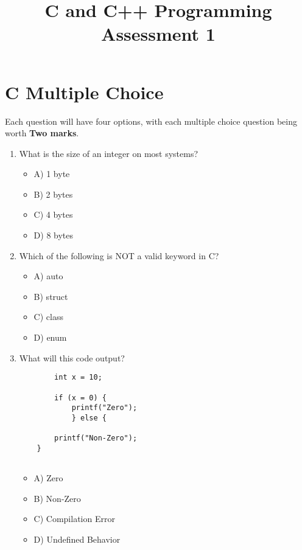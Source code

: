 \documentclass[a4paper,12pt]{article}
\begin{document}
\title{C and C++ Programming Assessment 1}
\maketitle

\newpage
\pagestyle{empty}

\section{C Multiple Choice}

Each question will have four options, with each multiple choice question being worth \textbf{Two marks}.

\begin{enumerate}
    \item What is the size of an integer on most systems?
    \begin{itemize}
        \item A) 1 byte
        \item B) 2 bytes
        \item C) 4 bytes
        \item D) 8 bytes
    \end{itemize}

    \item Which of the following is NOT a valid keyword in C?
    \begin{itemize}
        \item A) auto
        \item B) struct
        \item C) class
        \item D) enum
    \end{itemize}

    \item What will this code output?

    \lstset{language=C}
    \begin{lstlisting}
        int x = 10;
        
        if (x = 0) {
            printf("Zero");
            } else {
    
        printf("Non-Zero");
    }
    
    \end{lstlisting}    
    
    \begin{itemize}
        \item A) Zero
        \item B) Non-Zero
        \item C) Compilation Error
        \item D) Undefined Behavior
    \end{itemize}


\end{enumerate}
\end{document}
